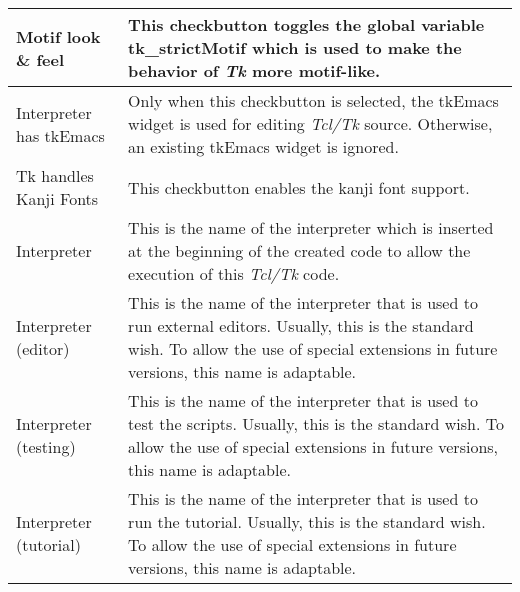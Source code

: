 {\newpage
\clearpage
\samepage \begin{supertabular}{|l|p{6.8cm}|}
Motif look \& feel       & This checkbutton toggles the
                          global variable tk\_strict\-Motif
                          which is used to make the behavior
                          of {\em Tk }
 more motif-like.\\  \hline
Interpreter has tkEmacs & Only when this checkbutton is
                          selected, the tkEmacs widget is
                          used for editing {\em Tcl/Tk }
 source.
                          Otherwise, an existing tkEmacs
                          widget is ignored.\\  \hline
Tk handles Kanji Fonts  & This checkbutton enables the kanji
                          font support.\\  \hline
Interpreter             & This is the name of the
                          interpreter which is inserted at
                          the beginning of the created code
                          to allow the execution of this
                          {\em Tcl/Tk }
 code.\\  \hline
Interpreter (editor)    & This is the name of the
                          interpreter that is used to run
                          external editors. Usually, this is
                          the standard wish. To allow the
                          use of special extensions in future
                          versions, this name is adaptable.\\  \hline
Interpreter (testing)   & This is the name of the
                          interpreter that is used to test
                          the scripts. Usually, this is the
                          standard wish. To allow the use of
                          special extensions in future
                          versions, this name is adaptable.\\  \hline
Interpreter (tutorial)  & This is the name of the
                          interpreter that is used to run
                          the tutorial. Usually, this is the
                          standard wish. To allow the use of
                          special extensions in future
                          versions, this name is adaptable.\\  \hline
\end{supertabular}
}

{\newpage
\clearpage
\samepage \begin{figure}[hbt]
  \centerline{
  \epsfysize=12.5cm
  }
  
  \label{fig:The procedure XFProcOptionsPathFile}
\end{figure}
}

